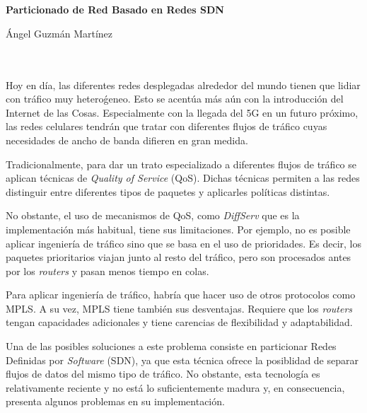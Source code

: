 \chapter*{}



\cleardoublepage
\thispagestyle{empty}

\begin{center}
{\large\bfseries Particionado de Red Basado en Redes SDN}\\
\end{center}
\begin{center}
Ángel Guzmán Martínez\\
\end{center}

\\

\vspace{0.7cm}
\\

Hoy en día, las diferentes redes desplegadas alrededor del mundo tienen que lidiar con tráfico muy heteroǵeneo. Esto se acentúa más aún con la introducción del Internet de las Cosas. Especialmente con la llegada del 5G en un futuro próximo, las redes celulares tendrán que tratar con diferentes flujos de tráfico cuyas necesidades de ancho de banda difieren en gran medida.

Tradicionalmente, para dar un trato especializado a diferentes flujos de tráfico se aplican técnicas de \textit{Quality of Service} (QoS). Dichas técnicas permiten a las redes distinguir entre diferentes tipos de paquetes y aplicarles políticas distintas. 

No obstante, el uso de mecanismos de QoS, como \textit{DiffServ} que es la implementación más habitual, tiene sus limitaciones. Por ejemplo, no es posible aplicar ingeniería de tráfico sino que se basa en el uso de prioridades. Es decir, los paquetes prioritarios viajan junto al resto del tráfico, pero son procesados antes por los \textit{routers} y pasan menos tiempo en colas. 

Para aplicar ingeniería de tráfico, habría que hacer uso de otros protocolos como MPLS. A su vez, MPLS tiene también sus desventajas. Requiere que los \textit{routers} tengan capacidades adicionales y tiene carencias de flexibilidad y adaptabilidad.

Una de las posibles soluciones a este problema consiste en particionar Redes Definidas por \textit{Software} (SDN), ya que esta técnica ofrece la posiblidad de separar flujos de datos del mismo tipo de tráfico. No obstante, esta tecnología es relativamente reciente y no está lo suficientemente madura y, en consecuencia, presenta algunos problemas en su implementación.

